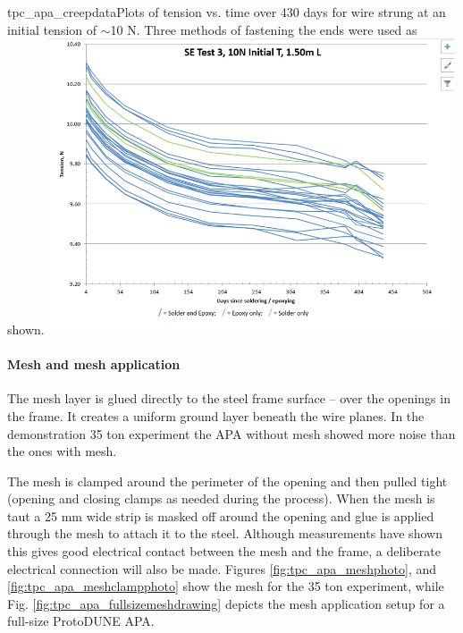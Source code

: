 \begin{cdrfigure}{tpc_apa_creepdata}{Plots of tension vs. time over 430 days for wire strung at an initial tension of $\sim$10 N.  Three methods of fastening the ends were used as shown.}
\includegraphics[width=0.9\textwidth]{figures/tpc_apa_creepdata.png} 
\end{cdrfigure}

\paragraph{Mesh and mesh application}

The mesh layer is glued directly to the steel frame surface -- over the openings in the frame.  It creates a uniform ground layer beneath the wire planes.  In the demonstration 35 ton experiment the APA without mesh showed more noise than the ones with mesh.

The mesh is clamped around the perimeter of the opening and then pulled tight (opening and closing clamps as needed during the process).  When the mesh is taut a 25 mm wide strip is masked off around the opening and glue is applied through the mesh to attach it to the steel.  Although measurements have shown this gives good electrical contact between the mesh and the frame, a deliberate electrical connection will also be made.  Figures \ref{fig:tpc_apa_meshphoto}, and \ref{fig:tpc_apa_meshclampphoto} show the mesh for the 35 ton experiment, while Fig. \ref{fig:tpc_apa_fullsizemeshdrawing} depicts the mesh application setup for a full-size ProtoDUNE APA.

